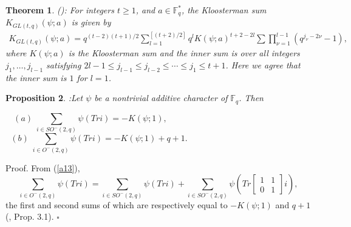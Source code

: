 \documentclass[a4,12pt]{elsart}
\newtheorem{theorem}{Theorem}
\newtheorem{proposition}[theorem]{Proposition}
\begin{document}
\begin{theorem}\label{B}(\cite{D1}): For integers $t \geq 1$, and $a \in {\mathbb{F}}_q^*$, the
Kloosterman sum $K_{GL(t,q)}(\psi ; a)$ is given by
\begin{multline*}
K_{GL(t,q)}(\psi ; a)=q^{(t-2)(t+1)/2} \sum_{l=1}^{[(t+2)/2]} q^l
K(\psi;a)^{t+2-2l} \sum \prod_{\nu=1}^{l-1} (q^{j_\nu -2\nu}-1),
\end{multline*}
where  $K(\psi;a)$ is the Kloosterman sum and the inner sum is over
all integers $j_1,\ldots,j_{l-1}$ satisfying $2l-1 \leq j_{l-1} \leq
j_{l-2} \leq \cdots \leq j_1 \leq t+1$. Here we agree that the inner
sum is $1$ for $l=1$.
\end{theorem}

\begin{proposition}:\label{C}
Let $\psi$ be a nontrivial additive character of ${\mathbb{F}}_q$. Then
\begin{flushleft}
\begin{equation}\label{a28}
(a) \;  \sum _{i \in SO^-(2,q)}\psi(Tr i )=-K( \psi;1), \qquad
\qquad \qquad \qquad \qquad \qquad \qquad \qquad
\end{equation}
\begin{equation}\label{a29}
(b) \; \sum_{ i \in O^-(2,q)} \psi(Tr i )=-K( \psi;1)+q+1.  \qquad
\qquad \qquad \qquad \qquad \qquad \qquad
\end{equation}
\end{flushleft}
\end{proposition}

{{\sc Proof.} \enspace} From (\ref{a13}),
\[
\sum_{i \in O^-(2,q)}\psi(Tr i )=\sum_{i \in SO^-(2,q)} \psi( Tr i
)+ \sum_{i \in SO^-(2,q )} \psi(Tr \left[\begin{smallmatrix}
    1     & 1   \\
    0     & 1
   \end{smallmatrix}\right] i),
\]
the first and second sums of which are respectively equal to
$-K(\psi;1)$ and $q+1$ (\cite{D4}, Prop. 3.1).
 \qquad
\qquad \qquad \qquad \qquad  \qquad \qquad \qquad
\qquad \qquad \qquad \qquad \qquad $\square$\\
\end{document}
